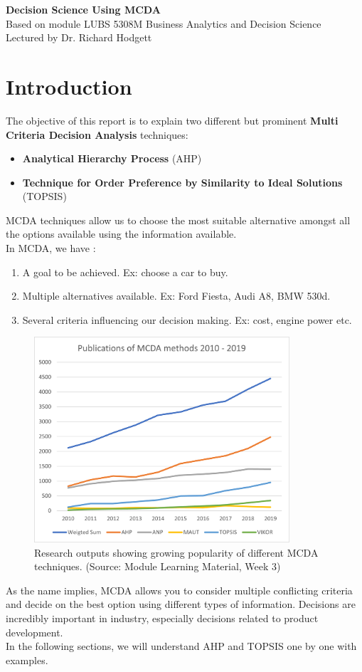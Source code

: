 \documentclass[10pt, a4paper]{article}
\begin{document}
\begin{center}
\textbf{\Large Decision Science Using MCDA} \\
Based on module LUBS 5308M Business Analytics and Decision Science \\
Lectured by Dr. Richard Hodgett \\
\end{center}

\section*{Introduction}
\noindent The objective of this report is to explain two different but prominent \textbf{Multi Criteria Decision Analysis} techniques:
\begin{itemize}[noitemsep]
    \item \textbf{Analytical Hierarchy Process }(AHP)
    \item \textbf{Technique for Order Preference by Similarity to Ideal Solutions }(TOPSIS)
\end{itemize}
MCDA techniques allow us to choose the most suitable alternative amongst all the options available using the information available.\\
In MCDA, we have :
\begin{enumerate}[noitemsep]
    \item A goal to be achieved. Ex: choose a car to buy.
    \item Multiple alternatives available. Ex: Ford Fiesta, Audi A8, BMW 530d.
    \item Several criteria influencing our decision making. Ex: cost, engine power etc.
\end{enumerate}
\begin{figure}[h]
	\includegraphics[width=9.5cm]{LUBS5308M Week03 Img001 - MCDA Methods}
	\centering
	\caption{Research outputs showing growing popularity of different MCDA techniques. (Source: Module Learning Material, Week 3)}
    \end{figure}
As the name implies, MCDA allows you to consider multiple conflicting criteria and decide on the best option using different types of information. 
Decisions are incredibly important in industry, especially decisions related to product development.\\
In the following sections, we will understand AHP and TOPSIS one by one with examples.
\end{document}
